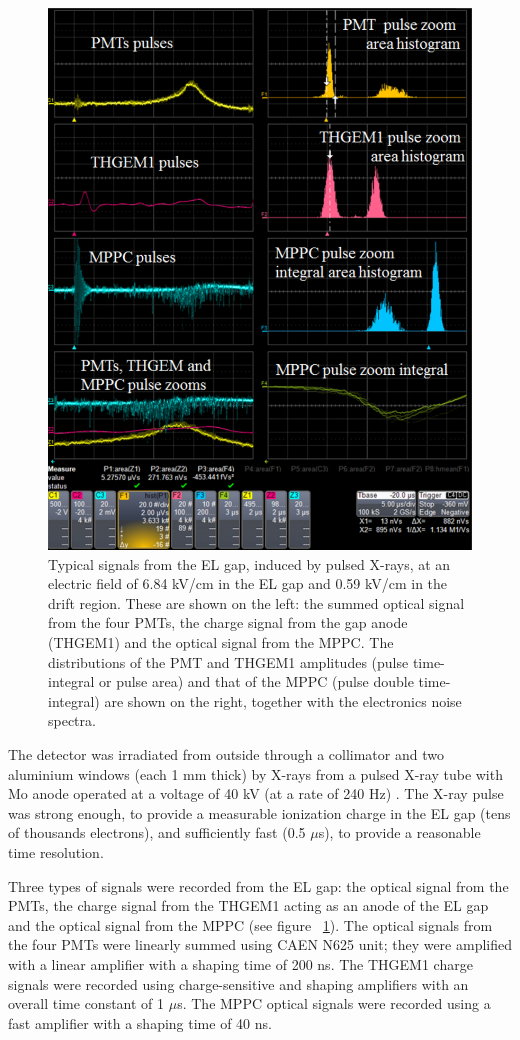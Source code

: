 \documentclass[a4paper,11pt]{article}
\begin{document}
\begin{figure}[hbt]
	\centering
	\includegraphics[width=0.6\columnwidth,keepaspectratio]{fig3}
	\caption{Typical signals from the EL gap, induced by pulsed X-rays, at an electric field of 6.84 kV/cm in the EL gap and 0.59 kV/cm in the drift region. These are shown on the left: the summed optical signal from the four PMTs, the charge signal from the gap anode (THGEM1)  and the optical signal from the MPPC. The distributions of the PMT and THGEM1 amplitudes (pulse time-integral or pulse area) and that of the MPPC (pulse double time-integral) are shown on the right, together with the electronics noise spectra.}
	\label{Signal}
\end{figure}

The detector was irradiated from outside through a collimator and two aluminium windows (each 1 mm thick) by X-rays from a pulsed X-ray tube with Mo anode operated at a voltage of 40 kV (at a rate of 240 Hz) \cite{XRayYield16}. The X-ray pulse was strong enough, to provide a measurable ionization charge in the EL gap (tens of thousands electrons), and sufficiently fast (0.5 $\mu$s), to provide a reasonable time resolution.

Three types of signals were recorded from the EL gap: the optical signal from the PMTs, the charge signal from the THGEM1 acting as an anode of the EL gap and the optical signal from the MPPC (see figure ~\ref{Signal}). The optical signals from the four PMTs were linearly summed using CAEN N625 unit; they were amplified with a linear amplifier with a shaping time of 200 ns. The THGEM1 charge signals were recorded using charge-sensitive and shaping amplifiers with an overall time constant of 1 $\mu$s. The MPPC optical signals were recorded using a fast amplifier with a shaping time of 40 ns.
\end{document}
